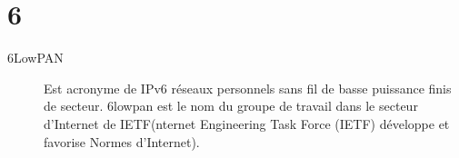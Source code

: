 \section{6}

\begin{description}

\item [6LowPAN]
Est acronyme de IPv6 réseaux personnels sans fil de basse puissance finis de secteur. 6lowpan est le nom du groupe de travail dans le secteur d'Internet de IETF(nternet Engineering Task Force (IETF) développe et favorise Normes d'Internet).

\end{description}
